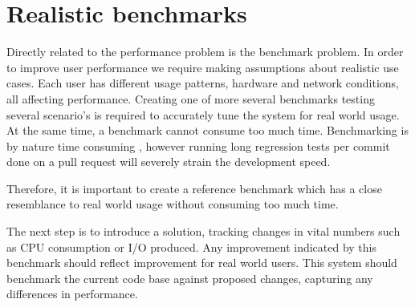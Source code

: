 \section{Realistic benchmarks}
Directly related to the performance problem is the benchmark problem.
In order to improve user performance we require making assumptions about realistic use cases.
Each user has different usage patterns, hardware and network conditions, all affecting performance.
Creating one of more several benchmarks testing several scenario's is required to accurately tune the system for real world usage.
At the same time, a benchmark cannot consume too much time.
Benchmarking is by nature time consuming \cite{huang2014performance}, however running long regression tests per commit done on a pull request will severely strain the development speed.

Therefore, it is important to create a reference benchmark which has a close resemblance to real world usage without consuming too much time.

The next step is to introduce a solution, tracking changes in vital numbers such as CPU consumption or I/O produced.
Any improvement indicated by this benchmark should reflect improvement for real world users.
This system should benchmark the current code base against proposed changes, capturing any differences in performance.




